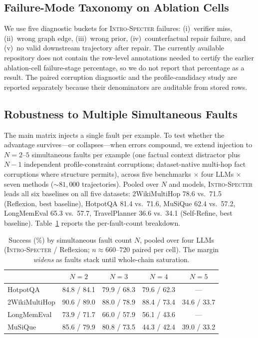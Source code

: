 \documentclass{article}
\newcommand{\method}{\textsc{Intro-Specter}\xspace}
\begin{document}
\subsection{Failure-Mode Taxonomy on Ablation Cells}\label{sec:failure-taxonomy}

We use five diagnostic buckets for \method failures: (i)~verifier miss, (ii)~wrong graph edge, (iii)~wrong prior, (iv)~counterfactual repair failure, and (v)~no valid downstream trajectory after repair. The currently available repository does not contain the row-level annotations needed to certify the earlier ablation-cell failure-stage percentage, so we do not report that percentage as a result. The paired corruption diagnostic and the profile-candidacy study are reported separately because their denominators are auditable from stored rows.

\subsection{Robustness to Multiple Simultaneous Faults}\label{sec:multifault}

The main matrix injects a single fault per example. To test whether the advantage survives---or collapses---when errors compound, we extend injection to $N{=}2$--$5$ simultaneous faults per example (one factual context distractor plus $N{-}1$ independent profile-constraint corruptions; dataset-native multi-hop fact corruptions where structure permits), across five benchmarks $\times$ four LLMs $\times$ seven methods (${\sim}81{,}000$ trajectories). Pooled over $N$ and models, \method leads all six baselines on all five datasets: 2WikiMultiHop 78.6 vs.\ 71.5 (Reflexion, best baseline), HotpotQA 81.4 vs.\ 71.6, MuSiQue 62.4 vs.\ 57.2, LongMemEval 65.3 vs.\ 57.7, TravelPlanner 36.6 vs.\ 34.1 (Self-Refine, best baseline). Table~\ref{tab:multifault} reports the per-fault-count breakdown.

\begin{table}[t]\centering\small
\caption{Success (\%) by simultaneous fault count $N$, pooled over four LLMs (\method{} / Reflexion; $n{\approx}660$--$720$ paired per cell). The margin \emph{widens} as faults stack until whole-chain saturation.}
\label{tab:multifault}
\begin{tabular}{lcccc}\toprule
 & $N{=}2$ & $N{=}3$ & $N{=}4$ & $N{=}5$ \\\midrule
HotpotQA      & 84.8 / 84.1 & 79.9 / 68.3 & 79.6 / 62.3 & --- \\
2WikiMultiHop & 90.6 / 89.0 & 88.0 / 78.9 & 88.4 / 73.4 & 34.6 / 33.7 \\
LongMemEval   & 73.9 / 71.7 & 66.0 / 57.9 & 56.1 / 43.6 & --- \\
MuSiQue       & 85.6 / 79.9 & 80.8 / 73.5 & 44.3 / 42.4 & 39.0 / 33.2 \\
\bottomrule\end{tabular}\end{table}
\end{document}
